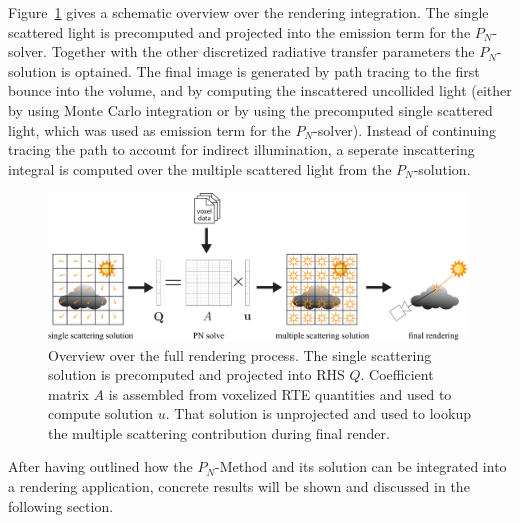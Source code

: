 Figure~\ref{fig:pn_rendering_integration_overview} gives a schematic overview over the rendering integration. The single scattered light is precomputed and projected into the emission term for the $P_N$-solver. Together with the other discretized radiative transfer parameters the $P_N$-solution is optained. The final image is generated by path tracing to the first bounce into the volume, and by computing the inscattered uncollided light (either by using Monte Carlo integration or by using the precomputed single scattered light, which was used as emission term for the $P_N$-solver). Instead of continuing tracing the path to account for indirect illumination, a seperate inscattering integral is computed over the multiple scattered light from the $P_N$-solution.

\begin{figure}[h]
\centering
\includegraphics[width=0.99\textwidth]{04_pn_method/figures/fig_rendering_pipeline.pdf}
\caption{Overview over the full rendering process. The single scattering solution is precomputed and projected into RHS $Q$. Coefficient matrix $A$ is assembled from voxelized RTE quantities and used to compute solution $u$. That solution is unprojected and used to lookup the multiple scattering contribution during final render.}
\label{fig:pn_rendering_integration_overview}
\end{figure}

After having outlined how the $P_N$-Method and its solution can be integrated into a rendering application, concrete results will be shown and discussed in the following section.

